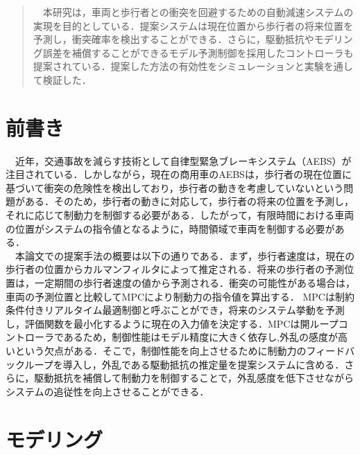 


\begin{abstract}
　本研究は，車両と歩行者との衝突を回避するための自動減速システムの実現を目的としている．提案システムは現在位置から歩行者の将来位置を予測し，衝突確率を検出することができる．さらに，駆動抵抗やモデリング誤差を補償することができるモデル予測制御を採用したコントローラも提案されている．提案した方法の有効性をシミュレーションと実験を通して検証した．
\end{abstract}

\maketitle
\pagestyle{fancy}

\section{前書き}
　近年，交通事故を減らす技術として自律型緊急ブレーキシステム（AEBS）が注目されている．しかしながら，現在の商用車のAEBSは，歩行者の現在位置に基づいて衝突の危険性を検出しており，歩行者の動きを考慮していないという問題がある．そのため，歩行者の動きに対応して，歩行者の将来の位置を予測し，それに応じて制動力を制御する必要がある．したがって，有限時間における車両の位置がシステムの指令値となるように，時間領域で車両を制御する必要がある．\\
　本論文での提案手法の概要は以下の通りである．まず，歩行者速度は，現在の歩行者の位置からカルマンフィルタによって推定される．将来の歩行者の予測位置は，一定期間の歩行者速度の値から予測される．衝突の可能性がある場合は，車両の予測位置と比較してMPCにより制動力の指令値を算出する． MPCは制約条件付きリアルタイム最適制御と呼ぶことができ，将来のシステム挙動を予測し，評価関数を最小化するように現在の入力値を決定する．MPCは開ループコントローラであるため，制御性能はモデル精度に大きく依存し,外乱の感度が高いという欠点がある．そこで，制御性能を向上させるために制動力のフィードバックループを導入し，外乱である駆動抵抗の推定量を提案システムに含める．さらに，駆動抵抗を補償して制動力を制御することで，外乱感度を低下させながらシステムの追従性を向上させることができる．\\

\section{モデリング}
